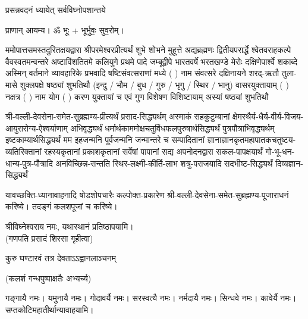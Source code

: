 
\setlength{\parindent}{0pt}




{प्रसन्नवदनं ध्यायेत् सर्वविघ्नोपशान्तये}

प्राणान् आयम्य। ॐ भूः + भूर्भुवः॒ सुव॒रोम्।



ममोपात्तसमस्तदुरितक्षयद्वारा श्रीपरमेश्वरप्रीत्यर्थं शुभे शोभने मुहूत्ते अद्यब्रह्मणः
द्वितीयपरार्द्धे श्वेतवराहकल्पे वैवस्वतमन्वन्तरे अष्टाविंशतितमे कलियुगे प्रथमे पादे
जम्बूद्वीपे भारतवर्षे भरतखण्डे मेरोः दक्षिणेपार्श्वे शकाब्दे अस्मिन् वर्तमाने व्यावहारिके
 प्रभवादि षष्टिसंवत्सराणां मध्ये (  ) नाम संवत्सरे दक्षिनायने 
शरद्-ऋतौ  तुला-मासे शुक्लपक्षे षष्ठ्यां शुभतिथौ
(इन्दु / भौम / बुध / गुरु / भृगु / स्थिर / भानु) वासरयुक्तायाम्
(  ) नक्षत्र (  ) नाम  योग  (  ) करण युक्तायां च एवं गुण विशेषण विशिष्टायाम् अस्यां षष्ठ्यां शुभतिथौ 

श्री-वल्ली-देवसेना-समेत-सुब्रह्मण्य-प्रीत्यर्थं प्रसाद-सिद्ध्यर्थम्
अस्माकं सहकुटुम्बानां क्षेमस्थैर्य-धैर्य-वीर्य-विजय-आयुरारोग्य-ऐश्वर्याणाम् अभिवृद्ध्यर्थं
धर्मार्थ\-काम\-मोक्ष\-चतुर्विध\-फल\-पुरुषार्थ\-सिद्ध्यर्थं पुत्र\-पौत्रा\-भि\-वृद्ध्यर्थम् इष्ट\-काम्यार्थ\-सिद्ध्यर्थं
मम इहजन्मनि पूर्वजन्मनि जन्मान्तरे च सम्पादितानां ज्ञानाज्ञानकृतमहा\-पातकचतुष्टय-व्यतिरिक्तानां रहस्यकृतानां प्रकाशकृतानां सर्वेषां पापानां सद्य अपनोदनद्वारा 
सकल-पाप\-क्षयार्थं गो-भू-धन-धान्य-पुत्र-पौत्रादि अनविच्छिन्न-सन्तति स्थिर-लक्ष्मी-कीर्ति-लाभ शत्रु-पराजयादि सदभीष्ट-सिद्ध्यर्थं दिव्यज्ञान-सिद्ध्यर्थं

यावच्छक्ति-ध्यानावाहनादि षोडशोपचारैः कल्पोक्त-प्रकारेण श्री-वल्ली-देवसेना-समेत-सुब्रह्मण्य-पूजाराधनं करिष्ये। तदङ्गं कलश\-पूजां च करिष्ये।


श्रीविघ्नेश्वराय नमः, यथास्थानं प्रतिष्ठापयामि।\\
(गणपति प्रसादं शिरसा गृहीत्वा)


{कुरु घण्टारवं तत्र देवताऽऽह्वानलाञ्चनम्}


(कलशं गन्धपुष्पाक्षतैः अभ्यर्च्य)

गङ्गायै नमः। यमुनायै नमः। गोदावर्यै नमः। सरस्वत्यै नमः। नर्मदायै नमः। सिन्धवे नमः। कावेर्यै नमः।\\
सप्तकोटिमहातीर्थान्यावाहयामि। \\

